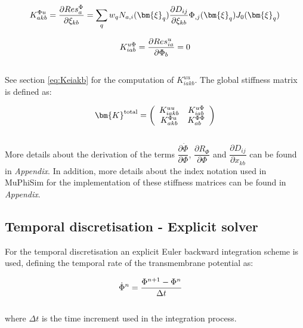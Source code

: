 \documentclass[oneside,11pt,times]{book}
\begin{document}
\begin{equation}
\begin{aligned}
\centering
K_{akb}^{\Phi u}= \dfrac{\partial{Res^{\Phi}_{a}}}{\partial{\xi_{kb}}} = \sum_q w_q N_{a,i}(\bm{\xi}_q) \dfrac{\partial{D_{ij}}}{\partial{\xi_{kb}}} \Phi_{,j}(\bm{\xi}_q) J_0(\bm{\xi}_q)
\end{aligned}
\label{equationKphiu}
\end{equation}

\begin{equation}
\begin{aligned}
\centering
K_{iab}^{u\Phi}=\dfrac{\partial{Res^{u}_{ia}}}{\partial{\Phi_{b}}}=0
\end{aligned}
\label{equationKuphi}
\end{equation}
\\

See section \ref{eq:Keiakb} for the computation of $K_{iakb}^{u u}$. The global stiffness matrix is defined as:

\begin{equation}
\begin{aligned}
\centering
\bm{K}^{\text{total}}=\left( \begin{array}{cc} K_{iakb}^{u u} & K_{iab}^{u\Phi} \\
K_{akb}^{\Phi u} & K_{ab}^{\Phi \Phi} \end{array} \right)
\end{aligned}
\label{equationKtotal}
\end{equation}
\\

More details about the derivation of the terms $\dfrac{\partial{\dot{\Phi}}}{\partial{\Phi}}$, $\dfrac{\partial{R_{\Phi}}}{\partial{\Phi}}$ and $\dfrac{\partial{{D_{ij}}}}{\partial{x_{kb}}}$ can be found in \textit{Appendix}. In addition, more details about the index notation used in MuPhiSim for the implementation of these stiffness matrices can be found in \textit{Appendix}.\\

\subsection{Temporal discretisation - Explicit solver}

For the temporal discretisation an explicit Euler backward integration scheme is used, defining the temporal rate of the transmembrane potential as:

\begin{equation}
\begin{aligned}
\centering
\dot{\Phi}^{n}&=\dfrac{\Phi^{n+1}-\Phi^{n}}{\Delta t}
\end{aligned}
\label{equationPhitimeExp}
\end{equation}
\\
where $\Delta t$ is the time increment used in the integration process.\\
\end{document}
